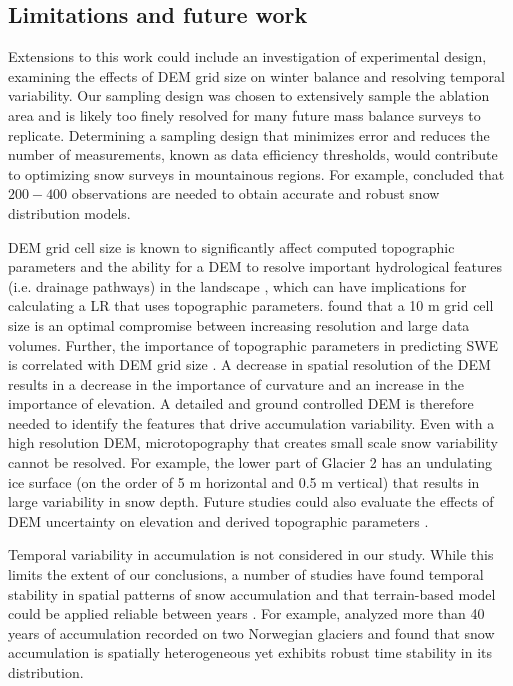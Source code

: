 \documentclass[review,oneside, letterpaper]{igs}
\begin{document}
\subsection{Limitations and future work}

Extensions to this work could include an investigation of experimental design, examining the effects of DEM grid size on winter balance and resolving temporal variability. Our sampling design was chosen to extensively sample the ablation area and is likely too finely resolved for many future mass balance surveys to replicate. Determining a sampling design that minimizes error and reduces the number of measurements, known as data efficiency thresholds, would contribute to optimizing snow surveys in mountainous regions. For example, \cite{Lopez2010} concluded that $200-400$ observations are needed to obtain accurate and robust snow distribution models. 

DEM grid cell size is known to significantly affect computed topographic parameters and the ability for a DEM to resolve important hydrological features (i.e. drainage pathways) in the landscape \citep{Zhang1994, Garbrecht1994, Guo-an2001, Lopez2010}, which can have implications for calculating a LR that uses topographic parameters.  \cite{Zhang1994} found that a 10 m grid cell size is an optimal compromise between increasing resolution and large data volumes. Further, the importance of topographic parameters in predicting SWE is correlated with DEM grid size \citep[e.g.][]{Kienzle2004, Lopez2010}. A decrease in spatial resolution of the DEM results in a decrease in the importance of curvature and an increase in the importance of elevation. A detailed and ground controlled DEM is therefore needed to identify the features that drive accumulation variability. Even with a high resolution DEM, microtopography that creates small scale snow variability cannot be resolved. For example, the lower part of Glacier 2 has an undulating ice surface (on the order of 5 m horizontal and 0.5 m vertical) that results in large variability in snow depth. Future studies could also evaluate the effects of DEM uncertainty on elevation and derived topographic parameters \citep [e.g.][]{Guo-an2001, Wechsler2006}. 

Temporal variability in accumulation is not considered in our study. While this limits the extent of our conclusions, a number of studies have found temporal stability in spatial patterns of snow accumulation and that terrain-based model could be applied reliable between years \citep[e.g.][]{Grunewald2013}. For example, \cite{Walmsley2015} analyzed more than 40 years of accumulation recorded on two Norwegian glaciers and found that snow accumulation is spatially heterogeneous yet exhibits robust time stability in its distribution. 
\end{document}

